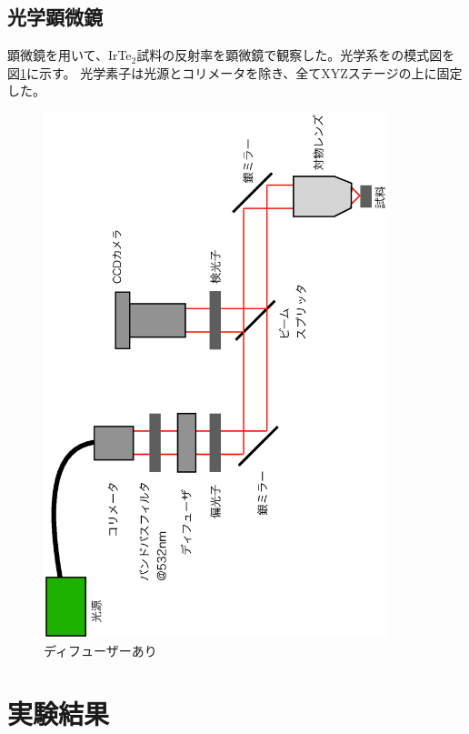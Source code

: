 \documentclass[11pt,a4paper]{jsarticle}
\begin{document}
\subsection{光学顕微鏡}
顕微鏡を用いて、IrTe$_2$試料の反射率を顕微鏡で観察した。光学系をの模式図を図\ref{fig:microscope}に示す。
光学素子は光源とコリメータを除き、全てXYZステージの上に固定した。
\begin{figure}[htbp]
  \begin{center}
   \includegraphics[width=100mm,angle=270]{microscope.eps}
  \end{center}
  \caption{ディフューザーあり}
  \label{fig:microscope}
\end{figure}


\section{実験結果}
\end{document}
